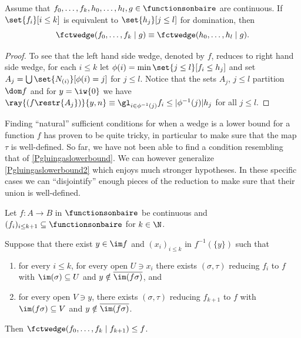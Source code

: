 \begin{corollary}\label{cor:wedgeSets}
Assume that $f_0,\ldots,f_k, h_0,\ldots, h_l, g \in \functionsonbaire$ are continuous. If $\set{f_i}[i\leq k]$ is equivalent to $\set{h_j}[j\leq l]$ for domination, then
\[\fctwedge(f_0,\ldots,f_k\mid g)\equiv\fctwedge(h_{0},\ldots,h_{l}\mid g).\]
\end{corollary}

\begin{proof}
To see that the left hand side wedge, denoted by $f$, reduces to right hand side wedge,
for each $i\leq k$ let $\phi(i)=\min \set{j\leq l}[f_i\leq h_j]$ and set $A_j=\bigcup \set{N_{(i)}}[\phi(i)=j]$ for $j\leq l$.
Notice that the sets $A_j$, $j\leq l$ partition $\dom f$ and for $y=\iw{0}$ we have $\ray{(f\restr{A_j})}{y,n}\equiv \gl_{i\in\phi^{-1}(j)} f_i \leq |\phi^{-1}(j)| h_j$ for all $j\leq l$. 
\end{proof}



Finding \enquote{natural} sufficient conditions for when a wedge is a lower bound for a function $f$ has proven to be quite tricky,
in particular to make sure that the map $\tau$ is well-defined. So far, we have not been able to find a condition resembling that of \cref{Pgluingaslowerbound}.
We can however generalize \cref{Pgluingaslowerbound2} which enjoys much stronger hypotheses.
In these specific cases we can \enquote{disjointify} enough pieces of the reduction to make sure that their union is well-defined.



\begin{lemma}\label{DisjointificationLemma}
Let $f:A\to B$ in $\functionsonbaire$ be continuous and $(f_i)_{i\leq k+1}\subseteq \functionsonbaire$ for $k\in \N$.

Suppose that there exist $y\in\im f$ and $(x_i)_{i\leq k}$ in $f^{-1}(\{y\})$ such that 
\begin{enumerate}
\item for every $i\leq k$, for every open $U\ni x_i$ there exists $(\sigma,\tau)$ reducing $f_i$ to $f$
with $\im(\sigma)\subseteq U$ and $y\notin \overline{\im(f\sigma)}$, and \label{disjoint_condition1}
\item for every open $V\ni y$, there exists $(\sigma,\tau)$ reducing $f_{k+1}$ to $f$ with $\im(f\sigma)\subseteq V$ and $y\notin\overline{\im(f\sigma)}$.\label{disjoint_condition2}
\end{enumerate}
Then $\fctwedge (f_0,\ldots,f_{k}\mid f_{k+1})\leq f$.
\end{lemma}

